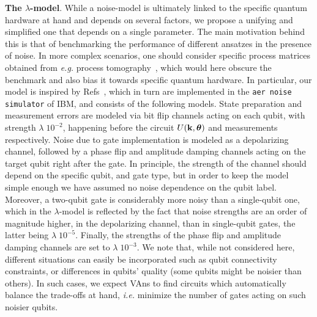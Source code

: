 \textbf{The $\lambda$-model}. While a noise-model is ultimately linked to the specific quantum hardware at hand and depends on several factors, we propose a unifying and simplified one that depends on a single parameter. The main motivation behind this is that of benchmarking the performance of different ansatzes in the presence of noise. In more complex scenarios, one should consider specific process matrices obtained from \textit{e.g.} process tomography~\cite{Obrien2004Quantum,Zhou2014Process}, which would here obscure the benchmark and also bias it towards specific quantum hardware. In particular, our model is inspired by Refs~\cite{Blank2020Quantum, Georgopoulos2021Modeling}, which in turn are implemented in the \texttt{aer noise simulator} of IBM, and consists of the following models. State preparation and measurement errors are modeled via bit flip channels acting on each qubit, with strength $\lambda \; 10^{-2}$, happening before the circuit $U(\mathbf{k}, \bm{\theta})$ and measurements respectively. Noise due to gate implementation is modeled as a depolarizing channel, followed by a phase flip and amplitude damping channels acting on the target qubit right after the gate. In principle, the strength of the channel should depend on the specific qubit, and gate type, but in order to keep the model simple enough we have assumed no noise dependence on the qubit label. Moreover, a two-qubit gate is considerably more noisy than a single-qubit one, which in the $\lambda$-model is reflected by the fact that noise strengths are an order of magnitude higher, in the depolarizing channel, than in single-qubit gates, the latter being $\lambda \; 10^{-5}$. Finally, the strengths of the phase flip and amplitude damping channels are set to $\lambda \; 10^{-3}$. We note that, while not considered here, different situations can easily be incorporated such as qubit connectivity constraints, or differences in qubits' quality (some qubits might be noisier than others). In such cases, we expect VAns to find circuits which automatically balance the trade-offs at hand, \textit{i.e.} minimize the number of gates acting on such noisier qubits.

